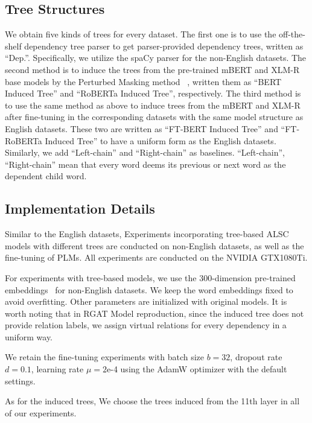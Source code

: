 \documentclass[11pt]{article}
\begin{document}
\subsection{Tree Structures}
We obtain five kinds of trees for every dataset. The first one is to use the off-the-shelf dependency tree parser to get parser-provided dependency trees, written as “Dep.”. Specifically,  we utilize the spaCy parser for the non-English datasets. The second method is to induce the trees from the pre-trained mBERT and XLM-R~\citep{DBLP:conf/acl/ConneauKGCWGGOZ20} base models by the Perturbed Masking method ~\citep{DBLP:conf/acl/WuCKL20}, written them as ``BERT Induced Tree'' and ``RoBERTa Induced Tree'', respectively. The third method is to use the same method as above to induce trees from the mBERT and XLM-R after fine-tuning in the corresponding datasets with the same model structure as English datasets. These two are written as ``FT-BERT Induced Tree'' and ``FT-RoBERTa Induced Tree'' to have a uniform form as the English datasets.  Similarly,  we add ``Left-chain'' and ``Right-chain'' as baselines. ``Left-chain'', ``Right-chain'' mean that every word deems its previous or next word as the dependent child word.
\subsection{Implementation Details}
Similar to the English datasets, Experiments incorporating tree-based ALSC models with different trees are conducted on non-English datasets, as well as the fine-tuning of PLMs. All experiments are conducted on the  NVIDIA GTX1080Ti.

For experiments with tree-based models, we use the 300-dimension pre-trained embeddings~\citep{DBLP:conf/emnlp/RuderGB16} for non-English datasets. We keep the word embeddings fixed to avoid overfitting. Other parameters are initialized with original models. It is worth noting that in RGAT Model reproduction, since the induced tree does not provide relation labels, we assign virtual relations for every dependency in a uniform way.

We retain the  fine-tuning experiments with batch size $b=32$, dropout rate $d=0.1$, learning rate $\mu=2$e-4 using the AdamW optimizer with the default settings.

As for the induced trees, We choose the trees induced from the 11th layer in  all of our experiments.
\end{document}
